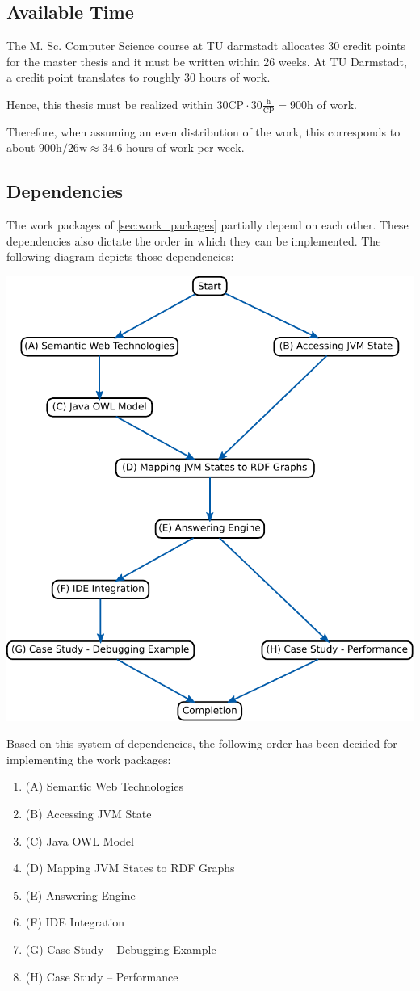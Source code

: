 \documentclass[
	english,
	accentcolor=9c,%
  marginpar=0cm %
	]{tudapub}
\begin{document}
\subsection{Available Time}
The M. Sc. Computer Science course at TU darmstadt allocates 30 credit points
for the master thesis and it must be written within 26 weeks.
At TU Darmstadt, a credit point translates to roughly 30 hours of work.

Hence, this thesis must be realized within
$30\text{CP} \cdot 30 \frac{\text{h}}{\text{CP}} = 900 \text{h}$ of work.

Therefore, when assuming an even distribution of the work, this corresponds to
about $900\text{h} / 26\text{w} \approx 34.6$ hours of work per week.

\subsection{Dependencies}
The work packages of \cref{sec:work_packages} partially depend on each
other. These dependencies also dictate the order in which they can be
implemented. The following diagram depicts those dependencies:

\begin{center}
  \includegraphics[width=0.6\linewidth]{gfx/dependencies.pdf}
\end{center}

Based on this system of dependencies, the following order has been decided for
implementing the work packages:

\begin{enumerate}
  \item (A) Semantic Web Technologies
  \item (B) Accessing JVM State
  \item (C) Java OWL Model
  \item (D) Mapping JVM States to RDF Graphs
  \item (E) Answering Engine
  \item (F) IDE Integration
  \item (G) Case Study -- Debugging Example
  \item (H) Case Study -- Performance
\end{enumerate}
\end{document}
